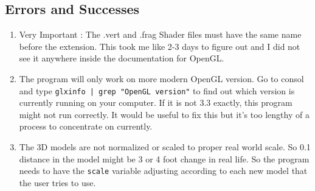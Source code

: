 \documentclass[a4paper,11pt]{article}
\begin{document}
        \subsection{Errors and Successes}
        \begin{enumerate}
        \item Very Important : The .vert and .frag Shader files must have the same name before the extension. This took me like 2-3 days to figure out and I did not see it anywhere inside the documentation for OpenGL.
        \item The program will only work on more modern OpenGL version. Go to consol and type \texttt{glxinfo | grep "OpenGL version"} to find out which version is currently running on your computer. If it is not 3.3 exactly, this program might not run correctly. It would be useful to fix this but it's too lengthy of a process to concentrate on currently.
        \item The 3D models are not normalized or scaled to proper real world scale. So 0.1 distance in the model might be 3 or 4 foot change in real life. So the program needs to have the \texttt{scale} variable adjusting according to each new model that the user tries to use.
        \end{enumerate}
\end{document}
